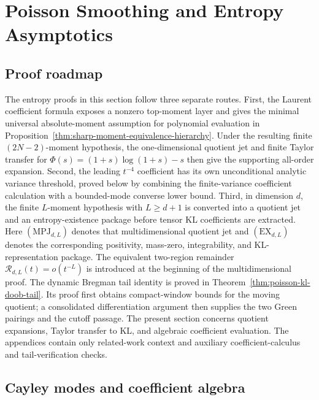 \section{Poisson Smoothing and Entropy Asymptotics}%
\label{sec:entropy-asymptotics}

\subsection*{Proof roadmap}
\label{sec:entropy-theorem-map}
\label{subsec:intro-hypotheses-scope}

The entropy proofs in this section follow three separate routes.  First, the
Laurent coefficient formula exposes a nonzero top-moment layer and gives the
minimal universal absolute-moment assumption for polynomial evaluation in
Proposition~\ref{thm:sharp-moment-equivalence-hierarchy}.  Under the resulting
finite \((2N-2)\)-moment hypothesis, the one-dimensional quotient jet and
finite Taylor transfer for \(\Phi(s)=(1+s)\log(1+s)-s\) then give the
supporting all-order expansion.  Second, the leading \(t^{-4}\) coefficient
has its own unconditional analytic variance threshold, proved below by
combining the finite-variance coefficient calculation with a bounded-mode
converse lower bound.  Third, in dimension \(d\), the finite
\(L\)-moment hypothesis with \(L\ge d+1\) is converted into a quotient jet and
an entropy-existence package before tensor KL coefficients are extracted.
Here \((\mathrm{MPJ}_{d,L})\) denotes that multidimensional quotient jet and
\((\mathrm{EX}_{d,L})\) denotes the corresponding positivity, mass-zero,
integrability, and KL-representation package.  The equivalent two-region
  remainder \(\mathcal R_{d,L}(t)=o(t^{-L})\) is introduced at the beginning of
the multidimensional proof.
The dynamic Bregman tail identity is proved in
Theorem~\ref{thm:poisson-kl-doob-tail}.  Its proof first obtains
compact-window bounds for the moving quotient; a consolidated differentiation
argument then supplies the two Green pairings and the cutoff passage.  The
present section concerns quotient expansions, Taylor transfer to KL, and
algebraic coefficient evaluation.
The appendices contain only related-work context and auxiliary
coefficient-calculus and tail-verification checks.

\subsection{Cayley modes and coefficient algebra}

